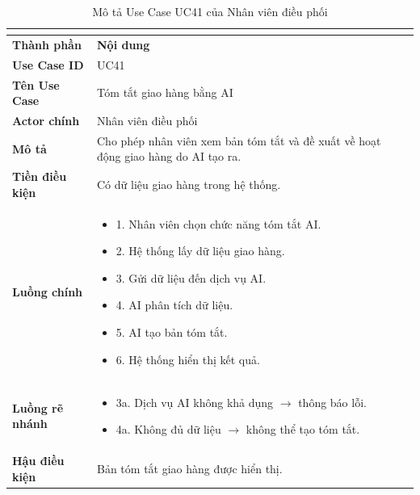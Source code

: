 \begin{longtable}{|C{3cm}|L{11cm}|}
\caption{Mô tả Use Case UC41 của Nhân viên điều phối}\\
\label{tab:mo-ta-uc41-dieu-phoi}\\
\hline
\textbf{Thành phần} & \textbf{Nội dung} \\
\hline
\textbf{Use Case ID} & UC41 \\
\hline
\textbf{Tên Use Case} & Tóm tắt giao hàng bằng AI \\
\hline
\textbf{Actor chính} & Nhân viên điều phối \\
\hline
\textbf{Mô tả} &
Cho phép nhân viên xem bản tóm tắt và đề xuất về hoạt động giao hàng do AI tạo ra. \\
\hline
\textbf{Tiền điều kiện} &
Có dữ liệu giao hàng trong hệ thống. \\
\hline
\textbf{Luồng chính} &
\begin{itemize}[leftmargin=*,topsep=2pt,itemsep=2pt]
    \item 1. Nhân viên chọn chức năng tóm tắt AI.
    \item 2. Hệ thống lấy dữ liệu giao hàng.
    \item 3. Gửi dữ liệu đến dịch vụ AI.
    \item 4. AI phân tích dữ liệu.
    \item 5. AI tạo bản tóm tắt.
    \item 6. Hệ thống hiển thị kết quả.
\end{itemize} \\
\hline
\textbf{Luồng rẽ nhánh} &
\begin{itemize}[leftmargin=*,topsep=2pt,itemsep=2pt]
    \item 3a. Dịch vụ AI không khả dụng $\rightarrow$ thông báo lỗi.
    \item 4a. Không đủ dữ liệu $\rightarrow$ không thể tạo tóm tắt.
\end{itemize} \\
\hline
\textbf{Hậu điều kiện} &
Bản tóm tắt giao hàng được hiển thị. \\
\hline
\end{longtable}


